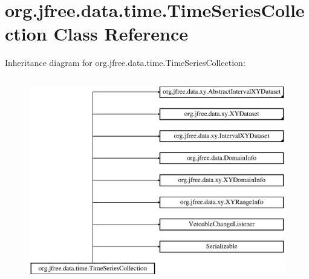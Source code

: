 \hypertarget{classorg_1_1jfree_1_1data_1_1time_1_1_time_series_collection}{}\section{org.\+jfree.\+data.\+time.\+Time\+Series\+Collection Class Reference}
\label{classorg_1_1jfree_1_1data_1_1time_1_1_time_series_collection}
Inheritance diagram for org.\+jfree.\+data.\+time.\+Time\+Series\+Collection\+:\begin{figure}[H]
\begin{center}
\leavevmode
\includegraphics[height=9.000000cm]{classorg_1_1jfree_1_1data_1_1time_1_1_time_series_collection}
\end{center}
\end{figure}
